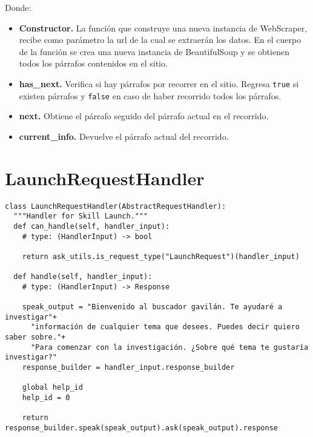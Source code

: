 Donde:

\begin{itemize}
  \item \textbf{Constructor.} La función que construye una nueva instancia de WebScraper, recibe como parámetro la url de la cual se extraerán los datos. En el cuerpo de la función se crea una nueva instancia de BeautifulSoup y se obtienen todos los párrafos contenidos en el sitio.
  \item \textbf{has\_next.} Verifica si hay párrafos por recorrer en el sitio. Regresa \texttt{true} si existen párrafos y \texttt{false} en caso de haber recorrido todos los párrafos.
  \item \textbf{next.} Obtiene el párrafo seguido del párrafo actual en el recorrido.
  \item \textbf{current\_info.} Devuelve el párrafo actual del recorrido.
\end{itemize}


\section{LaunchRequestHandler}
\label{A2Anexo}

\begin{tcolorbox}[colback=white!25!white,colframe=blue]
  \begin{verbatim}
class LaunchRequestHandler(AbstractRequestHandler):
  """Handler for Skill Launch."""
  def can_handle(self, handler_input):
    # type: (HandlerInput) -> bool

    return ask_utils.is_request_type("LaunchRequest")(handler_input)

  def handle(self, handler_input):
    # type: (HandlerInput) -> Response
        
    speak_output = "Bienvenido al buscador gavilán. Te ayudaré a investigar"+ 
      "información de cualquier tema que desees. Puedes decir quiero saber sobre."+
      "Para comenzar con la investigación. ¿Sobre qué tema te gustaría investigar?"
    response_builder = handler_input.response_builder
        
    global help_id
    help_id = 0

    return response_builder.speak(speak_output).ask(speak_output).response
  \end{verbatim}
\end{tcolorbox}

